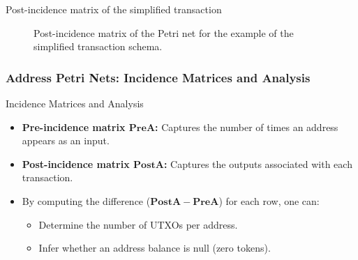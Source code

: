 \documentclass{beamer}
\begin{document}
\begin{frame}{Post-incidence matrix of the simplified transaction}
    \begin{figure}
        \vspace{.2cm}
        \caption{Post-incidence matrix of the Petri net for the example of the simplified transaction schema.}
        \label{Post-esempio1}
    \end{figure}
\end{frame}

\begin{frame}
    \frametitle{Address Petri Nets: Incidence Matrices and Analysis}
    \begin{block}{Incidence Matrices and Analysis}
        \begin{itemize}
            \item \textbf{Pre-incidence matrix \(\mathbf{PreA}\):} Captures the number of times an address appears as an input.
            \item \textbf{Post-incidence matrix \(\mathbf{PostA}\):} Captures the outputs associated with each transaction.
            \item By computing the difference (\(\mathbf{PostA} - \mathbf{PreA}\)) for each row, one can:
                  \begin{itemize}
                      \item Determine the number of UTXOs per address.
                      \item Infer whether an address balance is null (zero tokens).
                  \end{itemize}
        \end{itemize}
    \end{block}

\end{frame}
\end{document}
